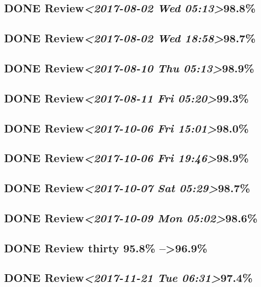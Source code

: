 \documentclass[11pt]{ctexart}
\begin{document}
\subsection{{\bfseries\sffamily DONE} Review\textit{<2017-08-02 Wed 05:13>}98.8\%}
\label{sec:org410f135}
\subsection{{\bfseries\sffamily DONE} Review\textit{<2017-08-02 Wed 18:58>}98.7\%}
\label{sec:org3d6fc04}
\subsection{{\bfseries\sffamily DONE} Review\textit{<2017-08-10 Thu 05:13>}98.9\%}
\label{sec:orgdfad49e}
\subsection{{\bfseries\sffamily DONE} Review\textit{<2017-08-11 Fri 05:20>}99.3\%}
\label{sec:org1013117}
\subsection{{\bfseries\sffamily DONE} Review\textit{<2017-10-06 Fri 15:01>}98.0\%}
\label{sec:org20db55f}

\subsection{{\bfseries\sffamily DONE} Review\textit{<2017-10-06 Fri 19:46>}98.9\%}
\label{sec:orgc390b60}
\subsection{{\bfseries\sffamily DONE} Review\textit{<2017-10-07 Sat 05:29>}98.7\%}
\label{sec:org2710d30}
\subsection{{\bfseries\sffamily DONE} Review\textit{<2017-10-09 Mon 05:02>}98.6\%}
\label{sec:orgeab376b}
\subsection{{\bfseries\sffamily DONE} Review thirty 95.8\% -->96.9\%}
\label{sec:orgaa0f4a6}

\subsection{{\bfseries\sffamily DONE} Review\textit{<2017-11-21 Tue 06:31>}97.4\%}
\label{sec:org4aea616}
\end{document}
